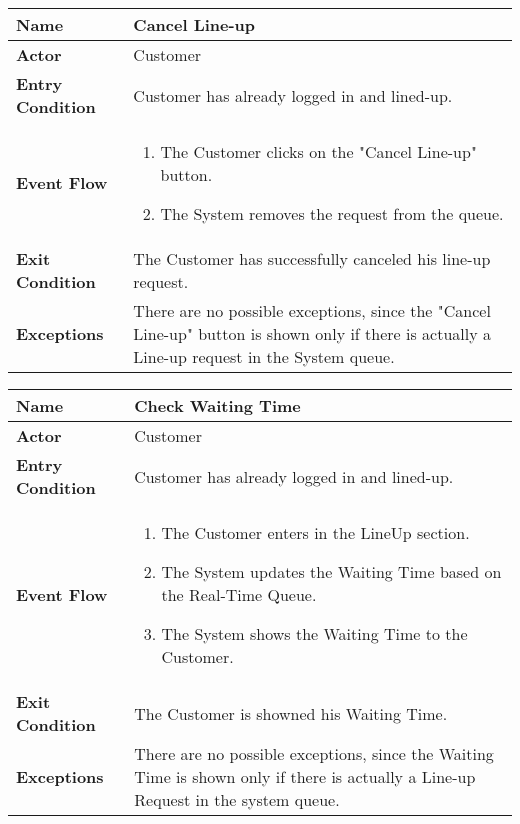 \begin{center}
    \begin{tabular}{ | l | p{11cm} |}
    \hline
    \textbf{Name} & Cancel Line-up \\ \hline
    \textbf{Actor} & Customer \\ \hline
    \textbf{Entry Condition} & Customer has already logged in and lined-up.  \\ \hline
    \textbf{Event Flow} & \begin{enumerate}
					\item The Customer clicks on the "Cancel Line-up" button.
					\item The System removes the request from the queue.
		            \end{enumerate}\\  \hline
    \textbf{Exit Condition} & The Customer has successfully canceled his line-up request. \\ \hline
    \textbf{Exceptions} & There are no possible exceptions, since the "Cancel Line-up" button is shown only if there is actually a Line-up request in the System queue.\\  \hline		
    \end{tabular}
\end{center}


\begin{center}
    \begin{tabular}{ | l | p{11cm} |}
    \hline
    \textbf{Name} & Check Waiting Time \\ \hline
    \textbf{Actor} & Customer \\ \hline
    \textbf{Entry Condition} & Customer has already logged in and lined-up.  \\ \hline
    \textbf{Event Flow} & \begin{enumerate}
					\item The Customer enters in the LineUp section.
					\item The System updates the Waiting Time based on the Real-Time Queue.
					\item The System shows the Waiting Time to the Customer.
		            \end{enumerate}\\  \hline
    \textbf{Exit Condition} & The Customer is showned his Waiting Time.\\ \hline
    \textbf{Exceptions} & There are no possible exceptions, since the Waiting Time is shown only if there is actually a Line-up Request in the system queue.\\  \hline	
    \end{tabular}
\end{center}


